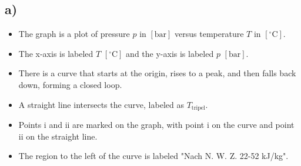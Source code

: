 

\subsection*{a)}

\begin{itemize}
    \item The graph is a plot of pressure \( p \) in \([ \text{bar} ]\) versus temperature \( T \) in \([ ^\circ \text{C} ]\).
    \item The x-axis is labeled \( T \) \([ ^\circ \text{C} ]\) and the y-axis is labeled \( p \) \([ \text{bar} ]\).
    \item There is a curve that starts at the origin, rises to a peak, and then falls back down, forming a closed loop.
    \item A straight line intersects the curve, labeled as \( T_{\text{tripel}} \).
    \item Points i and ii are marked on the graph, with point i on the curve and point ii on the straight line.
    \item The region to the left of the curve is labeled "Nach N. W. Z. 22-52 kJ/kg".
\end{itemize}
